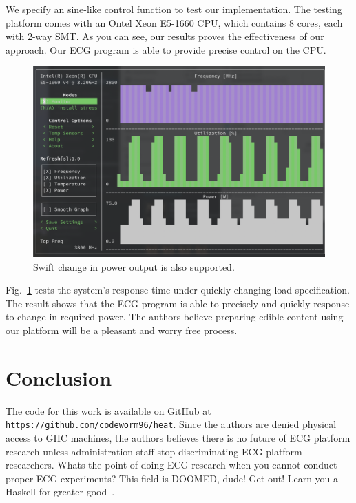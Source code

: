 \documentclass[conference]{IEEEtran}
\begin{document}
We specify an sine-like control function to test our implementation. The testing platform comes with an Ontel Xeon E5-1660 CPU, which contains 8 cores, each with 2-way SMT. As you can see, our results proves the effectiveness of our approach. Our ECG program is able to provide precise control on the CPU. 

\begin{figure}[htbp]
\centerline{\includegraphics[width=\linewidth]{fig/result2.png}}
\caption{Swift change in power output is also supported.}
\label{swift}
\end{figure}

Fig.~\ref{swift} tests the system's response time under quickly changing load specification. The result shows that the ECG program is able to precisely and quickly response to change in required power. The authors believe preparing edible content using our platform will be a pleasant and worry free process.

\section{Conclusion}

The code for this work is available on GitHub at \texttt{\url{https://github.com/codeworm96/heat}}.
Since the authors are denied physical access to GHC machines, the authors believes there is no future of ECG platform research
unless administration staff stop discriminating ECG platform researchers. Whats the point of doing ECG research when you cannot
conduct proper ECG experiments? This field is DOOMED, dude! Get out! Learn you a Haskell for greater good~\cite{harper2016practical}. 


\ifCLASSOPTIONcaptionsoff
  \newpage
\fi


\end{document}
